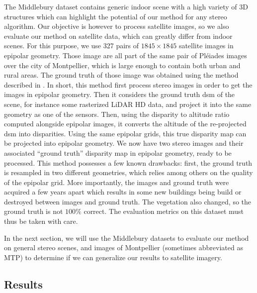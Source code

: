 The Middlebury dataset contains generic indoor scene with a high variety of 3D structures which can highlight the potential of our method for any stereo algorithm. Our objective is however to process satellite images, so we also evaluate our method on satellite data, which can greatly differ from indoor scenes. For this purpose, we use 327 pairs of $1845\times1845$ satellite images in epipolar geometry. Those image are all part of the same pair of Pléiades images over the city of Montpellier, which is large enough to contain both urban and rural areas. The ground truth of those image was obtained using the method described in \cite{cournet_ground_2020}. In short, this method first process stereo images in order to get the images in epipolar geometry. Then it considers the ground truth \acrshort{dsm} of the scene, for instance some rasterized LiDAR HD data, and project it into the same geometry as one of the sensors. Then, using the disparity to altitude ratio computed alongside epipolar images, it converts the altitude of the re-projected \acrshort{dsm} into disparities. Using the same epipolar grids, this true disparity map can be projected into epipolar geometry. We now have two stereo images and their associated ``ground truth'' disparity map in epipolar geometry, ready to be processed. This method possesses a few known drawbacks: first, the ground truth is resampled in two different geometries, which relies among others on the quality of the epipolar grid. More importantly, the images and ground truth were acquired a few years apart which results in some new buildings being build or destroyed between images and ground truth. The vegetation also changed, so the ground truth is not $100\%$ correct. The evaluation metrics on this dataset must thus be taken with care.

In the next section, we will use the Middlebury datasets to evaluate our method on general stereo scenes, and images of Montpellier (sometimes abbreviated as $\mathrm{MTP}$) to determine if we can generalize our results to satellite imagery.
\youshallnotpass

\subsection{Results}

